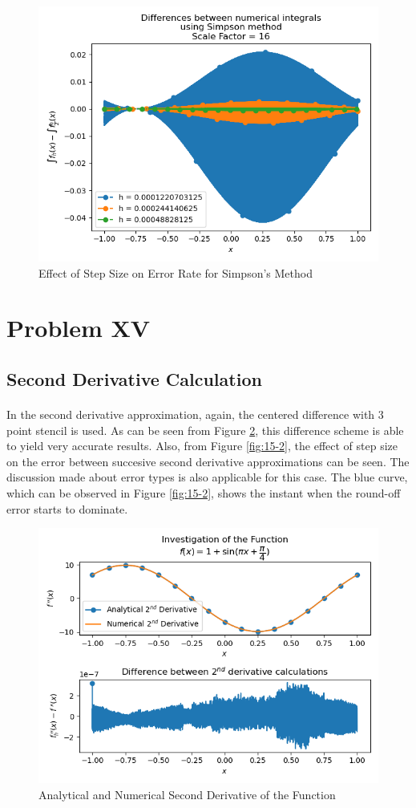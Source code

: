 \documentclass[letterpaper,12pt]{article}
\begin{document}
\begin{figure}[H]
\centerline{\includegraphics[width=0.7\linewidth]{figures/14-4-1.png}}
\caption{Effect of Step Size on Error Rate for Simpson's Method}
\label{fig:14-4-1}
\end{figure}

\section{Problem XV}

\subsection{Second Derivative Calculation}

\paragraph{} In the second derivative approximation, again, the centered difference with 3 point stencil is used. As can be seen from Figure \ref{fig:15-1}, this difference scheme is able to yield very accurate results. Also, from Figure \ref{fig:15-2}, the effect of step size on the error between succesive second derivative approximations can be seen. The discussion made about error types is also applicable for this case. The blue curve, which can be observed in Figure \ref{fig:15-2}, shows the instant when the round-off error starts to dominate.
\begin{figure}[H]
\centerline{\includegraphics[width=0.8\linewidth]{figures/15-1.png}}
\caption{Analytical and Numerical Second Derivative of the Function}
\label{fig:15-1}
\end{figure}
\end{document}
